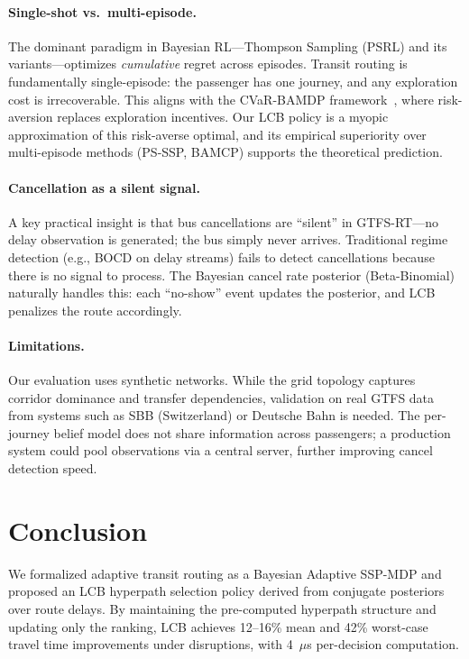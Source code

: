 \documentclass[journal]{IEEEtran}
\begin{document}
\paragraph{Single-shot vs.\ multi-episode.} The dominant paradigm in Bayesian RL---Thompson Sampling (PSRL) and its variants---optimizes \emph{cumulative} regret across episodes. Transit routing is fundamentally single-episode: the passenger has one journey, and any exploration cost is irrecoverable. This aligns with the CVaR-BAMDP framework~\cite{rigter2021}, where risk-aversion replaces exploration incentives. Our LCB policy is a myopic approximation of this risk-averse optimal, and its empirical superiority over multi-episode methods (PS-SSP, BAMCP) supports the theoretical prediction.

\paragraph{Cancellation as a silent signal.} A key practical insight is that bus cancellations are ``silent'' in GTFS-RT---no delay observation is generated; the bus simply never arrives. Traditional regime detection (e.g., BOCD on delay streams) fails to detect cancellations because there is no signal to process. The Bayesian cancel rate posterior (Beta-Binomial) naturally handles this: each ``no-show'' event updates the posterior, and LCB penalizes the route accordingly.

\paragraph{Limitations.} Our evaluation uses synthetic networks. While the grid topology captures corridor dominance and transfer dependencies, validation on real GTFS data from systems such as SBB (Switzerland) or Deutsche Bahn is needed. The per-journey belief model does not share information across passengers; a production system could pool observations via a central server, further improving cancel detection speed.

\section{Conclusion}
\label{sec:conclusion}

We formalized adaptive transit routing as a Bayesian Adaptive SSP-MDP and proposed an LCB hyperpath selection policy derived from conjugate posteriors over route delays. By maintaining the pre-computed hyperpath structure and updating only the ranking, LCB achieves 12--16\% mean and 42\% worst-case travel time improvements under disruptions, with 4~$\mu$s per-decision computation.
\end{document}
